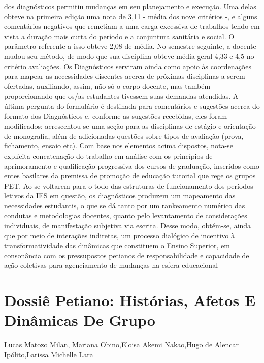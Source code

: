 dos diagnósticos permitiu mudanças em seu planejamento e execução. Uma delas obteve na
primeira edição uma nota de 3,11 - média dos nove critérios -, e alguns comentários negativos
que remetiam a uma carga excessiva de trabalhos tendo em vista a duração mais curta do período
e a conjuntura sanitária e social. O parâmetro referente a isso obteve 2,08 de média. No semestre
seguinte, a docente mudou seu método, de modo que sua disciplina obteve média geral 4,33 e 4,5
no critério avaliações. Os Diagnósticos serviram ainda como apoio às coordenações para mapear
as necessidades discentes acerca de próximas disciplinas a serem ofertadas, auxiliando, assim,
não só o corpo docente, mas também proporcionando que os/as estudantes tivessem suas
demandas atendidas. A última pergunta do formulário é destinada para comentários e sugestões
acerca do formato dos Diagnósticos e, conforme as sugestões recebidas, eles foram modificados:
acrescentou-se uma seção para as disciplinas de estágio e orientação de monografia, além de
adicionadas questões sobre tipos de avaliação (prova, fichamento, ensaio etc). Com base nos
elementos acima dispostos, nota-se explícita concatenação do trabalho em análise com os
princípios de aprimoramento e qualificação progressiva dos cursos de graduação, inseridos como
entes basilares da premissa de promoção de educação tutorial que rege os grupos PET. Ao se
voltarem para o todo das estruturas de funcionamento dos períodos letivos da IES em questão, os
diagnósticos produzem um mapeamento das necessidades estudantis, o que se dá tanto por um
rankeamento numérico das condutas e metodologias docentes, quanto pelo levantamento de
considerações individuais, de manifestação subjetiva via escrita. Desse modo, obtém-se, ainda
que por meio de interações indiretas, um processo dialógico de incentivo à transformatividade
das dinâmicas que constituem o Ensino Superior, em consonância com os pressupostos petianos
de responsabilidade e capacidade de ação coletivas para agenciamento de mudanças na esfera
educacional




\section*{Dossiê Petiano: Histórias, Afetos E Dinâmicas De Grupo}

Lucas Matozo Milan, Mariana Obino,Eloisa Akemi Nakao,Hugo de Alencar Ipólito,Larissa Michelle Lara

